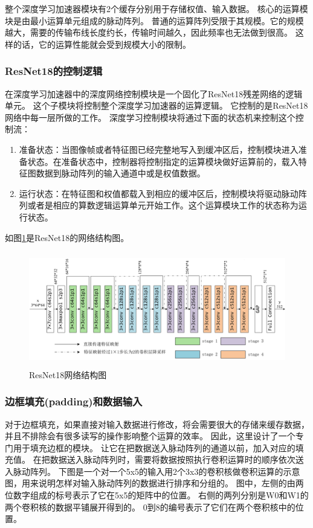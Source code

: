 整个深度学习加速器模块有2个缓存分别用于存储权值、输入数据。
核心的运算模块是由最小运算单元组成的脉动阵列。
普通的运算阵列受限于其规模。它的规模越大，需要的传输布线长度约长，传输时间越久，因此频率也无法做到很高。
这样的话，它的运算性能就会受到规模大小的限制。



\subsubsection{ResNet18的控制逻辑}
在深度学习加速器中的深度网络控制模块是一个固化了ResNet18残差网络的逻辑单元。
这个子模块将控制整个深度学习加速器的运算逻辑。
它控制的是ResNet18网络中每一层所做的工作。
深度学习控制模块将通过下面的状态机来控制这个控制流：
\begin{enumerate}
    \item 准备状态：当图像帧或者特征图已经完整地写入到缓冲区后，控制模块进入准备状态。在准备状态中，控制器将控制指定的运算模块做好运算前的，载入特征图数据到脉动阵列的输入通道中或是权值数据。
    \item 运行状态：在特征图和权值都载入到相应的缓冲区后，控制模块将驱动脉动阵列或者是相应的算数逻辑运算单元开始工作。这个运算模块工作的状态称为运行状态。
\end{enumerate}  
如图\ref{fig:resnet18_arch}是ResNet18的网络结构图。
\begin{figure}[htbp]
    \centering
    \includegraphics[width=12cm,height=5cm]{figures/resnet18_arch.png}
    \caption{ResNet18网络结构图}
    \label{fig:resnet18_arch}
\end{figure}

\subsubsection{边框填充(padding)和数据输入}
对于边框填充，如果直接对输入数据进行修改，将会需要很大的存储来缓存数据，并且不排除会有很多读写的操作影响整个运算的效率。
因此，这里设计了一个专门用于填充边框的模块。
让它在把数据送入脉动阵列的通道以前，加入对应的填充值。
在把数据送入脉动阵列时，需要将数据按照执行卷积运算时的顺序依次送入脉动阵列。
下图是一个对一个5x5的输入用2个3x3的卷积核做卷积运算的示意图，用来说明怎样对输入脉动阵列的数据进行排序和分组的。
图中，左侧的由两位数字组成的标号表示了它在5x5的矩阵中的位置。
右侧的两列分别是W0和W1的两个卷积核的数据平铺展开得到的。
0到8的编号表示了它们在两个卷积核中的位置。

